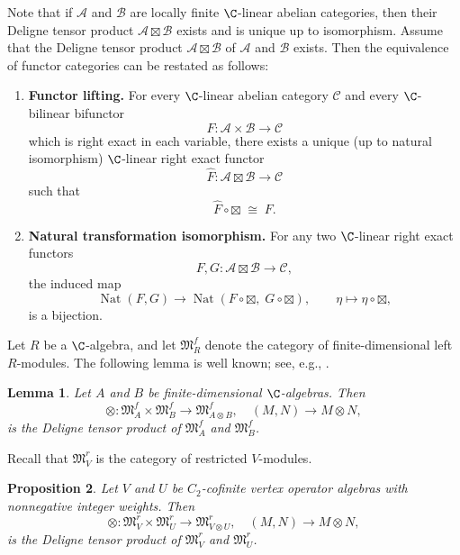 \documentclass[12pt, english]{article}
\numberwithin{equation}{section}
\DeclareMathOperator{\Nat}{Nat}
\theoremstyle{plain}
\newtheorem{lemma}{Lemma}[section]
\newtheorem{proposition}[lemma]{Proposition}
\theoremstyle{definition}
\theoremstyle{remark}
\begin{document}
	Note that if $\mathcal{A}$ and $\mathcal{B}$ are locally finite $\C$-linear abelian categories,
	then their Deligne tensor product $\mathcal{A} \boxtimes \mathcal{B}$ exists and is unique up to isomorphism.
	Assume that the Deligne tensor product $\mathcal{A}\boxtimes\mathcal{B}$ of $\mathcal{A}$ and $\mathcal{B}$ exists.  Then the equivalence of functor categories can be restated as follows:
	\begin{enumerate}[label=(\arabic*),ref=\arabic*]
		\item  \textbf{Functor lifting.}  For every $\C$-linear abelian category $\mathcal{C}$ and every $\C$-bilinear bifunctor
		\[
		F\colon \mathcal{A}\times\mathcal{B} \longrightarrow \mathcal{C}
		\]
		which is right exact in each variable, there exists a unique (up to natural isomorphism) $\C$-linear right exact functor
		\[
		\widehat{F} \colon \mathcal{A} \boxtimes \mathcal{B} \longrightarrow \mathcal{C}
		\]
		such that
		\[
		\widehat{F} \circ \boxtimes \; \cong \; F.
		\]
		
		\item \textbf{Natural transformation isomorphism.}   For any two $\C$-linear right exact functors
		\[
		F, G\colon \mathcal{A}\boxtimes\mathcal{B} \longrightarrow \mathcal{C},
		\]
		the induced map
		\begin{equation} \label{eq:deligne-naturality-bijection}
			\Nat(F, G)
			\longrightarrow
			\Nat(F\circ\boxtimes, \; G\circ\boxtimes),
			\qquad
			\eta \longmapsto \eta\circ\boxtimes,
		\end{equation}
		is a bijection.
	\end{enumerate}
	
	Let $R$ be a $\C$-algebra, and let $\mathfrak{M}^{f}_{R}$ denote the category of finite-dimensional left $R$-modules. The following lemma is well known; see, e.g., \cite{LF13}.
	\begin{lemma}
		Let $A$ and $B$ be finite-dimensional $\C$-algebras. Then
		\[
		\otimes \colon \mathfrak{M}^f_A \times \mathfrak{M}^f_B \longrightarrow \mathfrak{M}^f_{A \otimes B}, \quad
		(M, N) \longrightarrow M \otimes N,
		\]
		is the Deligne tensor product of $ \mathfrak{M}^f_A $ and $\mathfrak{M}^f_B $.
	\end{lemma}
	
	Recall that $\mathfrak{M}^r_V$ is the category of restricted $V$-modules.
	\begin{proposition} \label{prop:deligne-module-categories}
		Let $V$ and $U$ be $C_2$-cofinite vertex operator algebras with nonnegative integer weights.
		Then
		\[
		\otimes \colon \mathfrak{M}^r_V \times \mathfrak{M}^r_U \longrightarrow \mathfrak{M}^r_{V \otimes U}, \quad
		(M, N) \longrightarrow M \otimes N,
		\]
		is the Deligne tensor product of $ \mathfrak{M}^r_V $ and $\mathfrak{M}^r_U $.
	\end{proposition}
	
\end{document}

